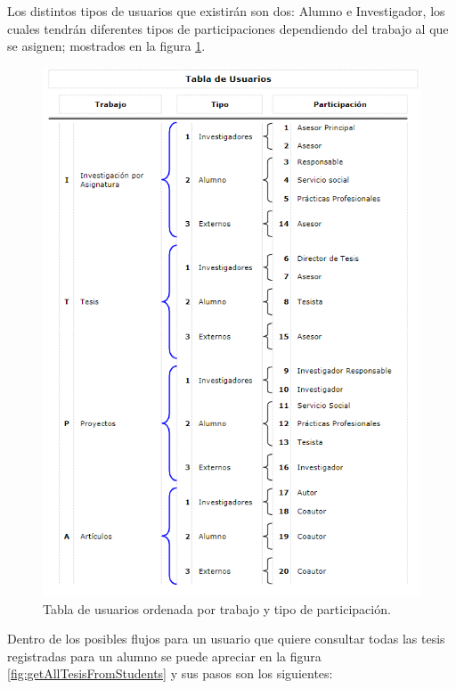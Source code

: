     Los distintos tipos de usuarios que existirán son dos: Alumno e Investigador, los cuales tendrán diferentes tipos de participaciones dependiendo del trabajo al que se asignen; mostrados en la figura \ref{fig:users_table}.
    
    \begin{figure}[H]
        \centering
        \includegraphics[width=\textwidth]{Propuesta_Plantilla_Tesis_LaTeX_UAG/imagenes/tabla_usuarios.png}
        \caption{Tabla de usuarios ordenada por trabajo y tipo de participación.}
        \label{fig:users_table}
    \end{figure}
    
    Dentro de los posibles flujos para un usuario que quiere consultar todas las tesis registradas para un alumno se puede apreciar en la figura \ref{fig:getAllTesisFromStudents} y sus pasos son los siguientes:
    
